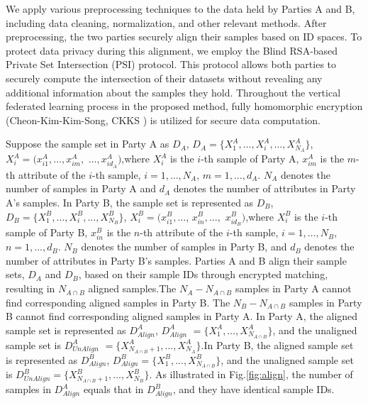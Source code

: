 \documentclass[final,1p,times]{elsarticle}
\begin{document}
We apply various preprocessing techniques to the data held by Parties A and B, including data cleaning, normalization, and other relevant methods. After preprocessing, the two parties securely align their samples based on ID spaces. To protect data privacy during this alignment, we employ the Blind RSA-based Private Set Intersection (PSI) protocol\cite{32}. This protocol allows both parties to securely compute the intersection of their datasets without revealing any additional information about the samples they hold. Throughout the vertical federated learning process in the proposed method, fully homomorphic encryption (Cheon-Kim-Kim-Song, CKKS \cite{33}) is utilized for secure data computation.

Suppose the sample set in Party A as $D_A$, $D_A=\{X_1^A,\ldots,X_i^A,\ldots,X_{N_A}^A\}$, 
$X_i^A=(x_{i1}^A,\ldots,x_{im}^A,$
$\ldots,x_{id_A}^A)$,where $X_i^A$ is the $i$-th sample of Party A, $x_{im}^A$ is the $m$-th attribute of the $i$-th sample, $i=1,\ldots,N_{A}$, $m=1,\ldots,d_A$. $N_A$ denotes the number of samples in Party A and $d_A$ denotes the number of attributes in Party A's samples. In Party B, the sample set is represented as $D_B$,$D_B=\{X_1^B,\ldots,X_i^B,\ldots,X_{N_B}^B\}$, $X_{i}^{B}=(x_{i1}^{B},\ldots$, $x_{in}^{B},\ldots,$
$x_{id_B}^{B})$,where $X_i^B$ is the $i$-th sample of Party B, $x_{in}^B$ is the $n$-th attribute of the $i$-th sample, $i=1,\ldots,N_B$, $n=1,\ldots,d_B$. $N_B$ denotes the number of samples in Party B, and $d_B$ denotes the number of attributes in Party B's samples. Parties A and B align their sample sets, $D_A$ and $D_B$, based on their sample IDs through encrypted matching, resulting in $N_{A \cap B}$ aligned samples.The $N_A-N_{A \cap B}$ samples in Party A cannot find corresponding aligned samples in Party B. The $N_B - N_{{A}\cap {B}}$ samples in Party B cannot find corresponding aligned samples in Party A. In Party A, the aligned sample set is represented as $D_{Align}^{A}$, $D_{Align}^{A}$ $=\{X_{1}^{A},\ldots,X_{N_{{A}\cap {B}}}^{A}\}$, and the unaligned sample set is $D_{UnAlign}^A$
$=\{X_{N_{{A}\cap {B}}+1}^A,\ldots,X_{N_{A}}^A\}$.In Party B, the aligned sample set is represented as $D_{Align}^B$, $D_{Align}^B=\{X_1^B,...,X_{N_{A\cap B}}^B\}$,
and the unaligned sample set is $D_{UnAlign}^{B}=\{X_{N_{{A}\cap {B}}+1}^{B},\ldots,X_{N_{B}}^{B}\}$.
As illustrated in Fig.\ref{fig:align}, the number of samples in $D_{Align}^A$ equals that in $D_{Align}^B$, and they have identical sample IDs.
\end{document}
